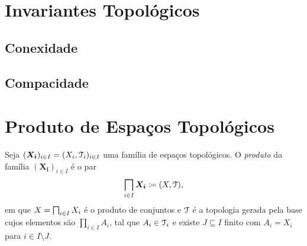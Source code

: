 \chapter{Invariantes Topológicos}

\section{Conexidade}

\section{Compacidade}









\chapter{Produto de Espaços Topológicos}

\begin{defi}
Seja $(\bm{X_i})_{i \in I} = (X_i,\mathcal{T}_i)_{i \in I}$ uma família de espaços topológicos. O \emph{produto} da família $(\bm{X_i})_{i \in I}$ é o par
	\begin{equation*}
	\prod\idx \bm{X_i} \coloneqq (X,\topo),
	\end{equation*}
em que $X = \prod\idx X_i$ é o produto de conjuntos e $\mathcal{T}$ é a topologia gerada pela base cujos elementos são $\prod_{i \in I} A_i$, tal que $A_i \in \mathcal{T}_i$ e existe $J \subseteq I$ finito com $A_i = X_i$ para $i \in I \setminus J$.
\end{defi}

